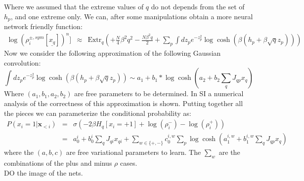 \documentclass{article}
\begin{document}
Where we assumed that the extreme values of $q$ do not depends from the set of $h_p$, and one extreme only.
We can, after some manipulations obtain a more neural network friendly function:
\begin{eqnarray}
\log (\rho_i^{\pm, sym} [\underline{x_q}])^n] & \approx & 
\text{Extr}_q \left( +\frac{N}{4}\beta^2 q^2 
-\frac{N\beta^2 q}{2}
+ \sum_p 
\int dz_p e^{-z_p^2}
\log \cosh \left(\beta \left(
h_p +\beta \sqrt{q}z_p \right)\right)
\right) 
\end{eqnarray}
Now we consider the following approximation of the following Gaussian convolution:
\[
\int dz_p e^{-z_p^2}
\log \cosh \left(\beta \left(
h_p +\beta \sqrt{q}z_p \right)\right) \sim a_1 + b_1*\log \cosh(a_2 + b_2 \sum_q J_{qp} x_q) 
\]
Where $(a_1, b_1, a_2, b_2)$ are free parameters to be determined. In SI \cite{} a numerical analysis of the correctness of this approximation is shown.  
Putting together all the pieces we can parameterize the conditional probability as:
\begin{eqnarray}
P\left(x_{i}=1|\mathbf{x}_{<i}\right) & = & \sigma\left( 
-2 \beta H_{q}[x_i = +1] +\log(\rho_i^-) - \log(\rho_i^+)
\right) \\
& = & a_0^i + b_0^i\sum_q J_{qi} x_{qi} + \sum_{w \in \{+,-\}} c_0^{i,w} \sum_p \log\cosh(a_1^{i,w} + b_1^{i,w}\sum_{q} J_{qp} x_q) 
\end{eqnarray}
where the $(a,b,c)$ are free variational parameters to learn. The $\sum_w$ are the combinations of the plus and minus $\rho$ cases. 
\\DO the image of the nets.
\end{document}

